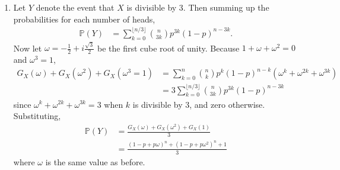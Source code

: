 \documentclass[a4paper,12pt]{article}
\begin{document}
\begin{enumerate}
\begin{enumerate}
            \item 
                Let $Y$ denote the event that $X$ is divisible by 3. Then summing up the probabilities for each number of heads,
                \begin{align*}
                    \mathbb{P}(Y) &= \sum_{k = 0}^{\lfloor n / 3 \rfloor} \binom{n}{3k} p^{3k} (1 - p)^{n - 3k}.
                \end{align*}
                Now let $\omega = -\frac{1}{2} + i\frac{\sqrt{3}}{2}$ be the first cube root of unity. Because $1 + \omega + \omega^2 = 0$ and $\omega^3 = 1$,
                \begin{align*}
                    G_X(\omega) + G_X(\omega^2) + G_X(\omega^3 = 1) &= \sum_{k = 0}^{n} \binom{n}{k} p^k (1 - p)^{n - k} (\omega^k + \omega^{2k} + \omega^{3k}) \\
                    &= 3 \sum_{k = 0}^{\lfloor n / 3 \rfloor} \binom{n}{3k} p^{3k} (1 - p)^{n - 3k}
                \end{align*}
                since $\omega^k + \omega^{2k} + \omega^{3k} = 3$ when $k$ is divisible by $3$, and zero otherwise. Substituting,
                \begin{align*}
                    \mathbb{P}(Y) &= \frac{G_X(\omega) + G_X(\omega^2) + G_X(1)}{3} \\
                    &= \frac{(1 - p + p\omega)^n + (1 - p + p\omega^2)^n + 1}{3}
                \end{align*}
                where $\omega$ is the same value as before.
        \end{enumerate}


\end{enumerate}
\end{document}

